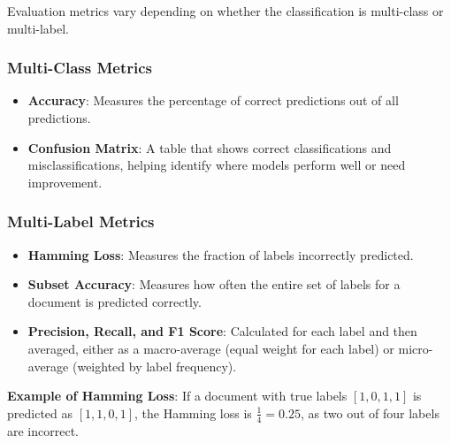 \documentclass{article}
\begin{document}
Evaluation metrics vary depending on whether the classification is multi-class or multi-label.

\subsubsection*{Multi-Class Metrics}
\begin{itemize}
    \item \textbf{Accuracy}: Measures the percentage of correct predictions out of all predictions.
    \item \textbf{Confusion Matrix}: A table that shows correct classifications and misclassifications, helping identify where models perform well or need improvement.
\end{itemize}

\subsubsection*{Multi-Label Metrics}
\begin{itemize}
    \item \textbf{Hamming Loss}: Measures the fraction of labels incorrectly predicted.
    \item \textbf{Subset Accuracy}: Measures how often the entire set of labels for a document is predicted correctly.
    \item \textbf{Precision, Recall, and F1 Score}: Calculated for each label and then averaged, either as a macro-average (equal weight for each label) or micro-average (weighted by label frequency).
\end{itemize}

\textbf{Example of Hamming Loss}:
If a document with true labels \([1, 0, 1, 1]\) is predicted as \([1, 1, 0, 1]\), the Hamming loss is \(\frac{1}{4} = 0.25\), as two out of four labels are incorrect.

\medskip
\end{document}
